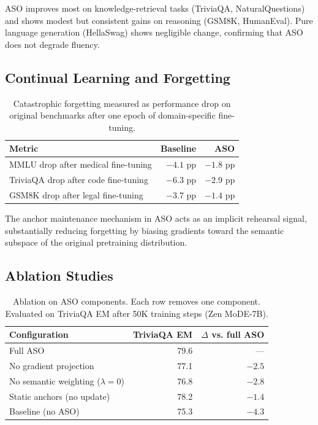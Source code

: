 \documentclass[11pt,a4paper]{article}
\begin{document}
ASO improves most on knowledge-retrieval tasks (TriviaQA, NaturalQuestions) and shows
modest but consistent gains on reasoning (GSM8K, HumanEval). Pure language generation
(HellaSwag) shows negligible change, confirming that ASO does not degrade fluency.

\subsection{Continual Learning and Forgetting}

\begin{table}[H]
\centering
\caption{Catastrophic forgetting measured as performance drop on original benchmarks
after one epoch of domain-specific fine-tuning.}
\begin{tabular}{lrr}
\toprule
\textbf{Metric} & \textbf{Baseline} & \textbf{ASO} \\
\midrule
MMLU drop after medical fine-tuning   & $-4.1$ pp & $-1.8$ pp \\
TriviaQA drop after code fine-tuning  & $-6.3$ pp & $-2.9$ pp \\
GSM8K drop after legal fine-tuning    & $-3.7$ pp & $-1.4$ pp \\
\bottomrule
\end{tabular}
\label{tab:forgetting}
\end{table}

The anchor maintenance mechanism in ASO acts as an implicit rehearsal signal,
substantially reducing forgetting by biasing gradients toward the semantic subspace of
the original pretraining distribution.

\subsection{Ablation Studies}

\begin{table}[H]
\centering
\caption{Ablation on ASO components. Each row removes one component. Evaluated on
TriviaQA EM after 50K training steps (Zen MoDE-7B).}
\begin{tabular}{lrr}
\toprule
\textbf{Configuration} & \textbf{TriviaQA EM} & \textbf{$\Delta$ vs. full ASO} \\
\midrule
Full ASO                         & 79.6 & --- \\
No gradient projection           & 77.1 & $-2.5$ \\
No semantic weighting ($\lambda=0$) & 76.8 & $-2.8$ \\
Static anchors (no update)       & 78.2 & $-1.4$ \\
Baseline (no ASO)                & 75.3 & $-4.3$ \\
\bottomrule
\end{tabular}
\label{tab:ablation}
\end{table}
\end{document}
